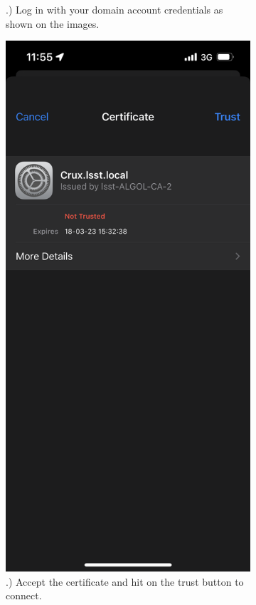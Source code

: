 \begin{figure}
\begin{subfigure}{0.30\textwidth}
      .) Log in with your domain account credentials as shown on the images.
    \end{subfigure}
        \hfill
    \begin{subfigure}{0.30\textwidth}
      \includegraphics[width=\textwidth]{Images/ios3.png}
      .) Accept the certificate and hit on the trust button to connect. 
    \end{subfigure}
  \end{figure} 


